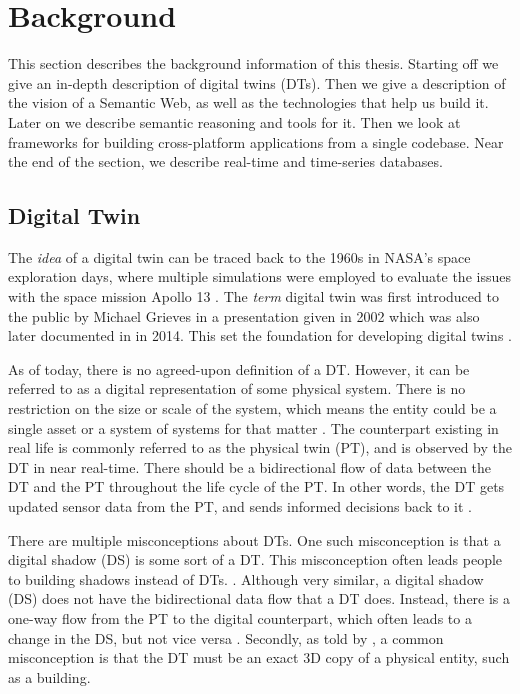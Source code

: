 \documentclass{article}
\begin{document}
\newpage
\section{Background}\label{sec:Background}
This section describes the background information of this thesis. Starting off we give an in-depth description of digital twins (DTs). Then we give a description of the vision of a Semantic Web, as well as the technologies that help us build it. Later on we describe semantic reasoning and tools for it.  Then we look at frameworks for building cross-platform applications from a single codebase. Near the end of the section, we describe real-time and time-series databases.

\subsection{Digital Twin}\label{subsec:DigitalTwins}

The \emph{idea} of a digital twin can be traced back to the 1960s in NASA's space exploration days, where multiple simulations were employed to evaluate the issues with the space mission Apollo 13 \cite{noauthor_digital_nodate, fuller_digital_2020}. The \emph{term} digital twin was first introduced to the public by Michael Grieves in a presentation given in 2002 which was also later documented in \cite{grieves_michael_digital_2014} in 2014. This set the foundation for developing digital twins \cite{grieves_michael_digital_2014, fuller_digital_2020}.

As of today, there is no agreed-upon definition of a DT. However, it can be referred to as a digital representation of some physical system. There is no restriction on the size or scale of the system, which means the entity could be a single asset or a system of systems for that matter \cite{li_digital_2022, waszak_let_2022}. The  counterpart existing in real life is commonly referred to as the physical twin (PT), and is observed by the DT in near real-time. There should be a bidirectional flow of data between the DT and the PT throughout the life cycle of the PT. In other words, the DT gets updated sensor data from the PT, and sends informed decisions back to it \cite{madni_leveraging_2019, waszak_let_2022, kamburjan_digital_2022}.



There are multiple misconceptions about DTs. One such misconception is that a digital shadow (DS) is some sort of a DT. This misconception often leads people to building shadows instead of DTs. \cite{fuller_digital_2020, li_digital_2022}.  Although very similar, a digital shadow (DS) does not have the bidirectional data flow that a DT does. Instead, there is a one-way flow from the PT to the digital counterpart, which often leads to a change in the DS, but not vice versa \cite{kritzinger_digital_2018, li_digital_2022}. Secondly, as told by \citeauthor{fuller_digital_2020}, a common misconception is that the DT must be an exact 3D copy of a physical entity, such as a building.
\end{document}
